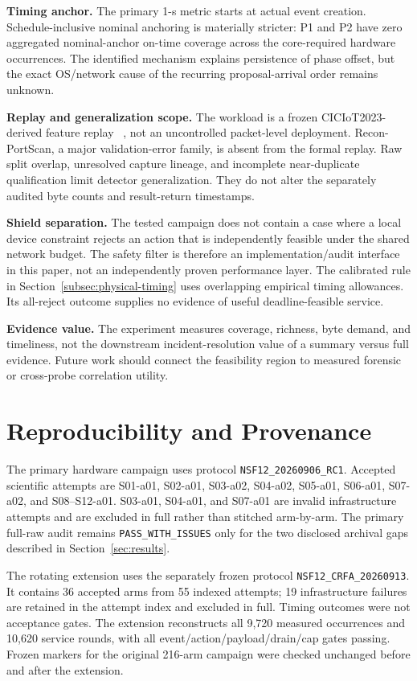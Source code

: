 \documentclass[10pt,journal]{IEEEtran}
\begin{document}
\textbf{Timing anchor.}
The primary 1-s metric starts at actual event creation. Schedule-inclusive
nominal anchoring is materially stricter: P1 and P2 have zero aggregated
nominal-anchor on-time coverage across the core-required hardware occurrences.
The identified mechanism explains persistence of phase offset, but the exact
OS/network cause of the recurring proposal-arrival order remains unknown.

\textbf{Replay and generalization scope.}
The workload is a frozen CICIoT2023-derived feature replay
~\cite{neto2023ciciot}, not an uncontrolled packet-level deployment.
Recon-PortScan, a major validation-error family, is absent from the formal
replay. Raw split overlap, unresolved capture lineage, and incomplete
near-duplicate qualification limit detector generalization. They do not
alter the separately audited byte counts and result-return timestamps.

\textbf{Shield separation.}
The tested campaign does not contain a case where a local device constraint
rejects an action that is independently feasible under the shared network
budget. The safety filter is therefore an implementation/audit interface in
this paper, not an independently proven performance layer.
The calibrated rule in Section~\ref{subsec:physical-timing} uses overlapping
empirical timing allowances. Its all-reject outcome supplies no evidence of
useful deadline-feasible service.

\textbf{Evidence value.}
The experiment measures coverage, richness, byte demand, and timeliness, not
the downstream incident-resolution value of a summary versus full evidence.
Future work should connect the feasibility region to measured forensic or
cross-probe correlation utility.

\section{Reproducibility and Provenance}
\label{sec:reproducibility}

The primary hardware campaign uses protocol
\texttt{NSF12\_20260906\_RC1}. Accepted scientific attempts are S01-a01,
S02-a01, S03-a02, S04-a02, S05-a01, S06-a01, S07-a02, and S08--S12-a01.
S03-a01, S04-a01, and S07-a01 are invalid infrastructure attempts and are
excluded in full rather than stitched arm-by-arm. The primary full-raw audit
remains \texttt{PASS\_WITH\_ISSUES} only for the two disclosed archival gaps
described in Section~\ref{sec:results}.

The rotating extension uses the separately frozen protocol
\texttt{NSF12\_CRFA\_20260913}. It contains 36 accepted arms from 55 indexed
attempts; 19 infrastructure failures are retained in the attempt index and
excluded in full. Timing outcomes were not acceptance gates. The extension
reconstructs all 9,720 measured occurrences and 10,620 service rounds, with
all event/action/payload/drain/cap gates passing. Frozen markers for the
original 216-arm campaign were checked unchanged before and after the
extension.
\end{document}
